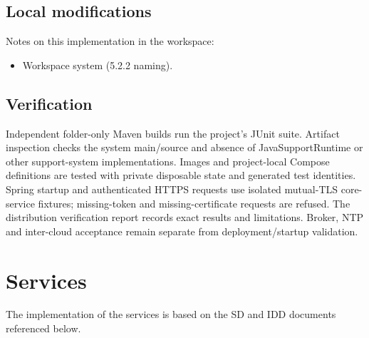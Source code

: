 \documentclass[a4paper]{arrowhead}
\begin{document}
\subsection{Local modifications}
\label{sec:local}

Notes on this implementation in the workspace:
\begin{itemize}
  \item Workspace system (5.2.2 naming).
\end{itemize}

\subsection{Verification}

Independent folder-only Maven builds run the project's JUnit suite. Artifact inspection checks the system main/source and absence of JavaSupportRuntime or other support-system implementations. Images and project-local Compose definitions are tested with private disposable state and generated test identities. Spring startup and authenticated HTTPS requests use isolated mutual-TLS core-service fixtures; missing-token and missing-certificate requests are refused. The distribution verification report records exact results and limitations. Broker, NTP and inter-cloud acceptance remain separate from deployment/startup validation.

\newpage

\section{Services}
\label{sec:services}

The implementation of the services is based on the SD and IDD documents referenced below.
\end{document}
